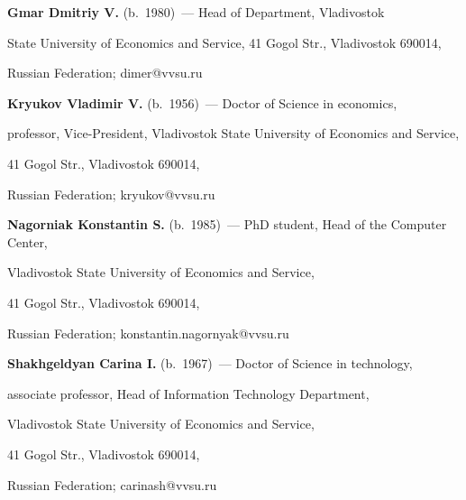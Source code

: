 \textbf{Gmar Dmitriy V.} (b.\ 1980)~--- Head of Department, Vladivostok 

State University of Economics and Service, 41 Gogol Str., Vladivostok 690014,

Russian Federation; dimer@vvsu.ru



\pagebreak



\noindent

\textbf{Kryukov Vladimir V.} (b.\ 1956)~--- Doctor of Science in economics, 

professor, Vice-President, Vladivostok State University of Economics and Service, 

41 Gogol Str., Vladivostok 690014,

Russian Federation; kryukov@vvsu.ru



\vspace*{3pt}



\noindent

\textbf{Nagorniak Konstantin S.} (b.\ 1985)~--- PhD student, Head of the Computer Center, 

Vladivostok State University of Economics and Service, 

41 Gogol Str., Vladivostok 690014,

Russian Federation; konstantin.nagornyak@vvsu.ru





\vspace*{3pt}



\noindent

\textbf{Shakhgeldyan Carina I.} (b.\ 1967)~--- Doctor of Science in technology, 

associate professor, Head of Information Technology Department, 

Vladivostok State University of Economics and Service, 

41 Gogol Str., Vladivostok 690014,

Russian Federation; carinash@vvsu.ru



\label{end\stat}



\renewcommand{\bibname}{\protect\rmfamily Литература}

